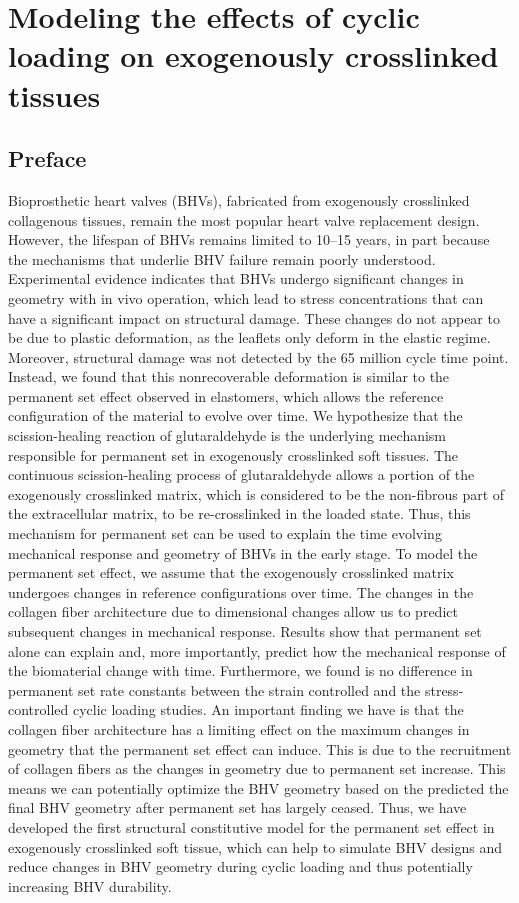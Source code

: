 \chapter{Modeling the effects of cyclic loading on exogenously cross\Hyphdash linked tissues}

\section*{Preface}
%

    Bioprosthetic heart valves (BHVs), fabricated from exogenously crosslinked collagenous tissues, remain the most popular heart valve replacement design. However, the lifespan of BHVs remains limited to 10–15 years, in part because the mechanisms that underlie BHV failure remain poorly understood. Experimental evidence indicates that BHVs undergo significant changes in geometry with in vivo operation, which lead to stress concentrations that can have a significant impact on structural damage. These changes do not appear to be due to plastic deformation, as the leaflets only deform in the elastic regime. Moreover, structural damage was not detected by the 65 million cycle time point. Instead, we found that this nonrecoverable deformation is similar to the permanent set effect observed in elastomers, which allows the reference configuration of the material to evolve over time. We hypothesize that the scission-healing reaction of glutaraldehyde is the underlying mechanism responsible for permanent set in exogenously crosslinked soft tissues. The continuous scission-healing process of glutaraldehyde allows a portion of the exogenously crosslinked matrix, which is considered to be the non-fibrous part of the extracellular matrix, to be re-crosslinked in the loaded state. Thus, this mechanism for permanent set can be used to explain the time evolving mechanical response and geometry of BHVs in the early stage. To model the permanent set effect, we assume that the exogenously crosslinked matrix undergoes changes in reference configurations over time. The changes in the collagen fiber architecture due to dimensional changes allow us to predict subsequent changes in mechanical response. Results show that permanent set alone can explain and, more importantly, predict how the mechanical response of the biomaterial change with time. Furthermore, we found is no difference in permanent set rate constants between the strain controlled and the stress-controlled cyclic loading studies. An important finding we have is that the collagen fiber architecture has a limiting effect on the maximum changes in geometry that the permanent set effect can induce. This is due to the recruitment of collagen fibers as the changes in geometry due to permanent set increase. This means we can potentially optimize the BHV geometry based on the predicted the final BHV geometry after permanent set has largely ceased. Thus, we have developed the first structural constitutive model for the permanent set effect in exogenously crosslinked soft tissue, which can help to simulate BHV designs and reduce changes in BHV geometry during cyclic loading and thus potentially increasing BHV durability.
    
